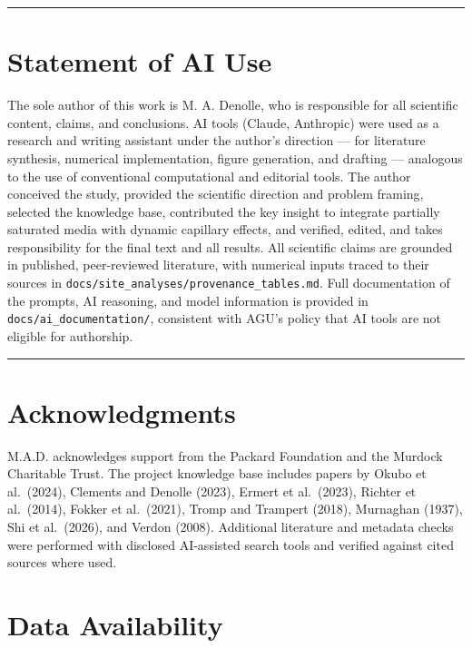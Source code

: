 \documentclass[draft]{agujournal2019}
\begin{document}
\begin{center}\rule{0.5\linewidth}{0.5pt}\end{center}

\section{Statement of AI Use}\label{statement-of-ai-use}

The sole author of this work is M. A. Denolle, who is responsible for
all scientific content, claims, and conclusions. AI tools (Claude,
Anthropic) were used as a research and writing assistant under the
author's direction --- for literature synthesis, numerical
implementation, figure generation, and drafting --- analogous to the use
of conventional computational and editorial tools. The author conceived
the study, provided the scientific direction and problem framing,
selected the knowledge base, contributed the key insight to integrate
partially saturated media with dynamic capillary effects, and verified,
edited, and takes responsibility for the final text and all results. All
scientific claims are grounded in published, peer-reviewed literature,
with numerical inputs traced to their sources in
\texttt{docs/site\_analyses/provenance\_tables.md}. Full documentation
of the prompts, AI reasoning, and model information is provided in
\texttt{docs/ai\_documentation/}, consistent with AGU's policy that AI
tools are not eligible for authorship.

\begin{center}\rule{0.5\linewidth}{0.5pt}\end{center}

\section{Acknowledgments}\label{acknowledgments}

M.A.D. acknowledges support from the Packard Foundation and the Murdock
Charitable Trust. The project knowledge base includes papers by Okubo et
al.~(2024), Clements and Denolle (2023), Ermert et al.~(2023), Richter
et al.~(2014), Fokker et al.~(2021), Tromp and Trampert (2018),
Murnaghan (1937), Shi et al.~(2026), and Verdon (2008). Additional
literature and metadata checks were performed with disclosed AI-assisted
search tools and verified against cited sources where used.

\section{Data Availability}\label{data-availability}
\end{document}
